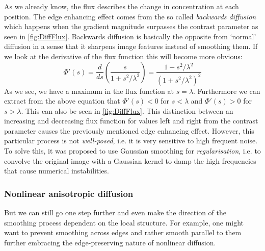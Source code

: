 As we already know, the flux describes the change in concentration at each position. The edge
enhancing effect comes from the so called \textit{backwards diffusion} which happens when the
gradient magnitude surpasses the contrast parameter as seen in \ref{fig:DiffFlux}. Backwards
diffusion is basically the opposite from `normal' diffusion in a sense that it sharpens image
features instead of smoothing them.
If we look at the derivative of the flux function this will become more obvious:
\begin{equation}
    \Phi'(s) = \frac{d}{ds} \left(\frac{s}{1 + s^2/\lambda^2}\right) = 
    \frac{1 - s^2/\lambda^2}{\left(1 + s^2/\lambda^2\right)^2}
\end{equation}
As we see, we have a maximum in the flux function at $s = \lambda$. Furthermore we can extract from
the above equation that $\Phi'(s) < 0$ for $s < \lambda$ and $\Phi'(s) > 0$ for $s > \lambda$. This
can also be seen in \ref{fig:DiffFlux}. This distinction between an increasing and decreasing flux
function for values left and right from the contrast parameter causes the previously mentioned
edge enhancing effect.
However, this particular process is not \textit{well-posed}\cite{weickert96}, i.e. it is very
sensitive to high frequent noise. To solve this, it was proposed to use Gaussian smoothing for
\textit{regularisation}, i.e. to convolve the original image with a Gaussian kernel to damp the high
frequencies that cause numerical instabilities\cite{catte-lions-morel92}.

\subsubsection*{Nonlinear anisotropic diffusion}
But we can still go one step further and even make the direction of the smoothing process dependent
on the local structure. For example, one might want to prevent smoothing across edges and rather
smooth parallel to them further embracing the edge-preserving nature of nonlinear diffusion.

